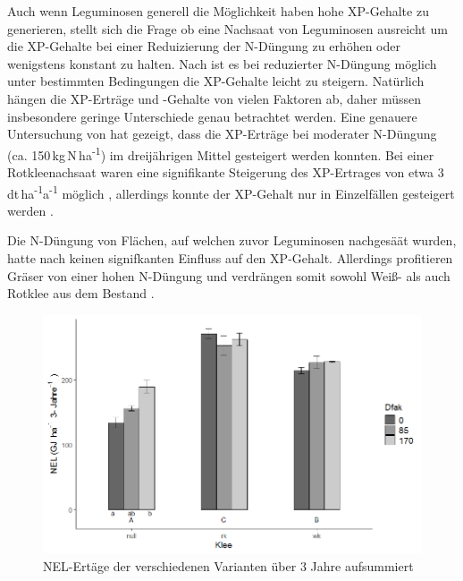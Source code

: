 Auch wenn Leguminosen generell die Möglichkeit haben hohe \ac{XP}-Gehalte  zu generieren, stellt sich die Frage ob eine Nachsaat von Leguminosen ausreicht um die \ac{XP}-Gehalte bei einer Reduizierung der N-Düngung zu erhöhen oder wenigstens konstant zu halten.
Nach \textcite[11]{engel2013protein} ist es bei reduzierter N-Düngung möglich unter bestimmten Bedingungen die \ac{XP}-Gehalte leicht zu steigern.
Natürlich hängen die \ac{XP}-Erträge und -Gehalte von vielen Faktoren ab, daher müssen insbesondere geringe Unterschiede genau betrachtet werden.
Eine genauere Untersuchung von \textcite{weggler2020langzeitbeobachtungen} hat gezeigt, dass die \ac{XP}-Erträge bei   moderater N-Düngung (ca. 150\,kg\,N\,ha\textsuperscript{-1}) im dreijährigen Mittel gesteigert werden konnten.
Bei einer Rotkleenachsaat waren eine signifikante Steigerung des \ac{XP}-Ertrages von etwa 3\,dt\,ha\textsuperscript{-1}a\textsuperscript{-1} möglich \parencite[12]{weggler2020langzeitbeobachtungen}, allerdings konnte der \ac{XP}-Gehalt nur in Einzelfällen gesteigert werden \parencite[13]{weggler2020langzeitbeobachtungen}.


Die N-Düngung von Flächen, auf welchen zuvor Leguminosen nachgesäät wurden, hatte nach \textcite[34]{weggler2050leguminosen} keinen signifkanten Einfluss auf den \ac{XP}-Gehalt.
Allerdings profitieren Gräser von einer hohen N-Düngung und verdrängen somit sowohl Weiß- als auch Rotklee aus dem Bestand \parencite[161]{black2009clover}.


\begin{figure}
	\includegraphics[scale=0.5]{images/wegglerAbb2}
	\caption[\ac{NEL}-Erträge der verschiedenen Varianten über 3 Jahre aufsummiert]{\ac{NEL}-Ertäge der verschiedenen Varianten über 3 Jahre aufsummiert \parencite[36]{weggler2050leguminosen}}
	\label{fig:wegglerAbb2}
\end{figure}

